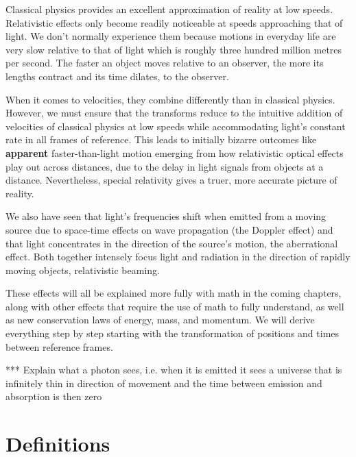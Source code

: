 Classical physics provides an excellent approximation of reality at low speeds. Relativistic effects only become readily noticeable at speeds approaching that of light. We don't normally experience them because motions in everyday life are very slow relative to that of light which is roughly three hundred million metres per second. The faster an object moves relative to an observer, the more its lengths contract and its time dilates, to the observer.

When it comes to velocities, they combine differently than in classical physics. However, we must ensure that the transforms reduce to the intuitive addition of velocities of classical physics at low speeds while accommodating light's constant rate in all frames of reference. This leads to initially bizarre outcomes like \textbf{apparent} faster-than-light motion emerging from how relativistic optical effects play out across distances, due to the delay in light signals from objects at a distance. Nevertheless, special relativity gives a truer, more accurate picture of reality.

We also have seen that light's frequencies shift when emitted from a moving source due to space-time effects on wave propagation (the Doppler effect) and that light concentrates in the direction of the source's motion, the aberrational effect. Both together intensely focus light and radiation in the direction of rapidly moving objects, relativistic beaming.

These effects will all be explained more fully with math in the coming chapters, along with other effects that require the use of math to fully understand, as well as new conservation laws of energy, mass, and momentum. We will derive everything step by step starting with the transformation of positions and times between reference frames.

*** Explain what a photon sees, i.e. when it is emitted it sees a universe that is infinitely thin in direction of movement and the time between emission and absorption is then zero

\section{Definitions}


